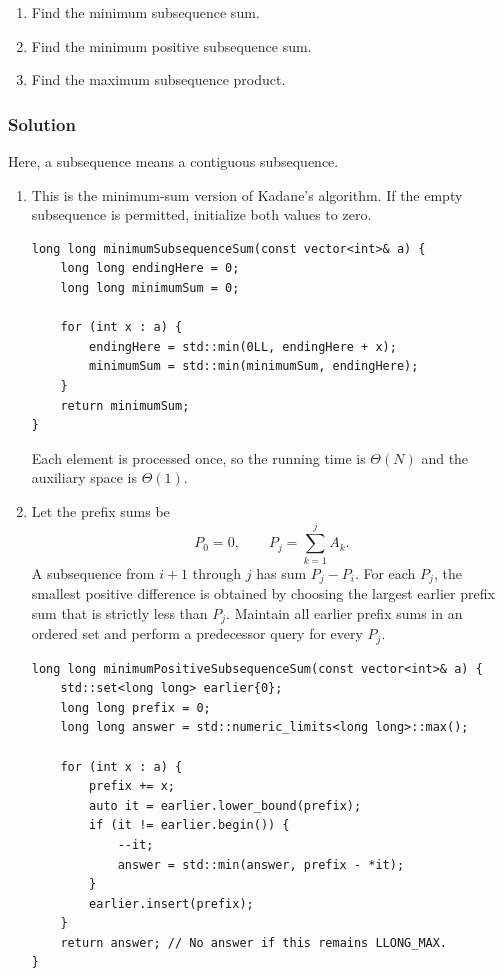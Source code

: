 \documentclass[12pt,a4paper]{article}
\begin{document}
\begin{enumerate}
  \renewcommand{\labelenumi}{\alph{enumi}.}
  \item Find the minimum subsequence sum.
  \item Find the minimum positive subsequence sum.
  \item Find the maximum subsequence product.
\end{enumerate}

\subsubsection*{\color{sectionnavy}Solution}

Here, a subsequence means a contiguous subsequence.

\begin{enumerate}
  \renewcommand{\labelenumi}{\alph{enumi}.}

  \item This is the minimum-sum version of Kadane's algorithm. If the
  empty subsequence is permitted, initialize both values to zero.

\begin{lstlisting}
long long minimumSubsequenceSum(const vector<int>& a) {
    long long endingHere = 0;
    long long minimumSum = 0;

    for (int x : a) {
        endingHere = std::min(0LL, endingHere + x);
        minimumSum = std::min(minimumSum, endingHere);
    }
    return minimumSum;
}
\end{lstlisting}

  Each element is processed once, so the running time is
  $\boxed{\Theta(N)}$ and the auxiliary space is $\Theta(1)$.

  \item Let the prefix sums be
  \[
  P_0=0,\qquad P_j=\sum_{k=1}^{j}A_k.
  \]
  A subsequence from $i+1$ through $j$ has sum $P_j-P_i$. For each
  $P_j$, the smallest positive difference is obtained by choosing the
  largest earlier prefix sum that is strictly less than $P_j$.
  Maintain all earlier prefix sums in an ordered set and perform a
  predecessor query for every $P_j$.

\begin{lstlisting}
long long minimumPositiveSubsequenceSum(const vector<int>& a) {
    std::set<long long> earlier{0};
    long long prefix = 0;
    long long answer = std::numeric_limits<long long>::max();

    for (int x : a) {
        prefix += x;
        auto it = earlier.lower_bound(prefix);
        if (it != earlier.begin()) {
            --it;
            answer = std::min(answer, prefix - *it);
        }
        earlier.insert(prefix);
    }
    return answer; // No answer if this remains LLONG_MAX.
}
\end{lstlisting}


\end{enumerate}
\end{document}
